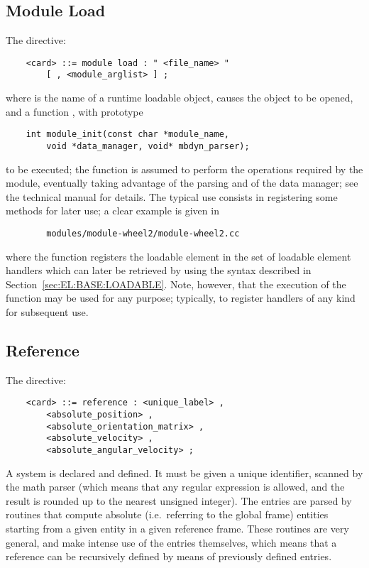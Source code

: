 \subsection{Module Load}\label{sec:GENERAL:MODULE-LOAD}
The  directive:
\begin{verbatim}
    <card> ::= module load : " <file_name> "
        [ , <module_arglist> ] ;
\end{verbatim}
where  is the name of a runtime loadable object,
causes the object to be opened, and a function ,
with prototype
\begin{verbatim}
    int module_init(const char *module_name,
        void *data_manager, void* mbdyn_parser);
\end{verbatim}
to be executed; the function is assumed to perform the operations
required by the module, eventually taking advantage of the parsing
and of the data manager; see the technical manual for details.
The typical use consists in registering some methods for later use;
a clear example is given in
\begin{verbatim}
        modules/module-wheel2/module-wheel2.cc
\end{verbatim}
where the function registers the loadable element in the set
of loadable element handlers which can later be retrieved by using
the syntax described in Section~\ref{sec:EL:BASE:LOADABLE}.
Note, however, that the execution of the  function 
may be used for any purpose; typically, to register handlers of any kind
for subsequent use.


\subsection{Reference}
The  directive:
\begin{verbatim}
    <card> ::= reference : <unique_label> , 
        <absolute_position> ,
        <absolute_orientation_matrix> ,
        <absolute_velocity> ,
        <absolute_angular_velocity> ;
\end{verbatim}
A  system is declared and defined.
It must be given a unique identifier, scanned by the math parser
(which means that any regular expression is allowed, and the result is
rounded up to the nearest unsigned integer).
The entries  are parsed by routines that
compute absolute (i.e.\ referring to the global frame) entities
starting from a given entity in a given reference frame.
These routines are very general, and make intense use of the 
 entries themselves, which means that a reference 
can be recursively defined by means of previously defined 
 entries.


